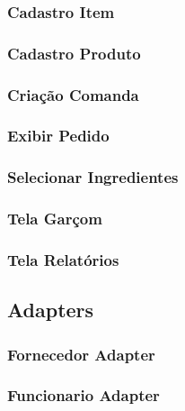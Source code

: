 \subsubsection{Cadastro Item}

\subsubsection{Cadastro Produto}

\subsubsection{Criação Comanda}

\subsubsection{Exibir Pedido}

\subsubsection{Selecionar Ingredientes}

\subsubsection{Tela Garçom}

\subsubsection{Tela Relatórios}



\subsection{Adapters}

\subsubsection{Fornecedor Adapter}

\subsubsection{Funcionario Adapter}

